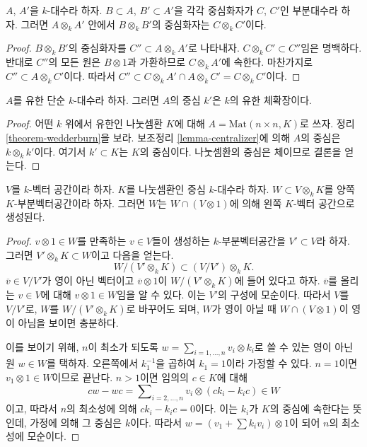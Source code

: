 \begin{lemma}
\label{lemma-centralizer}
$A$, $A'$을 $k$-대수라 하자. $B \subset A$, $B' \subset A'$을
각각 중심화자가 $C$, $C'$인 부분대수라 하자. 그러면
$A \otimes_k A'$ 안에서 $B \otimes_k B'$의 중심화자는
$C \otimes_k C'$이다.
\end{lemma}

\begin{proof}
$B \otimes_k B'$의 중심화자를 $C'' \subset A \otimes_k A'$로 나타내자.
$C \otimes_k C' \subset C''$임은 명백하다. 반대로 $C''$의 모든 원은
$B \otimes 1$과 가환하므로 $C \otimes_k A'$에 속한다.
마찬가지로 $C'' \subset A \otimes_k C'$이다. 따라서
$C'' \subset C \otimes_k A' \cap A \otimes_k C' = C \otimes_k C'$이다.
\end{proof}

\begin{lemma}
\label{lemma-center-csa}
$A$를 유한 단순 $k$-대수라 하자. 그러면 $A$의 중심 $k'$은
$k$의 유한 체확장이다.
\end{lemma}

\begin{proof}
어떤 $k$ 위에서 유한인 나눗셈환 $K$에 대해
$A = \text{Mat}(n \times n, K)$로 쓰자. 정리
\ref{theorem-wedderburn}을 보라.
보조정리 \ref{lemma-centralizer}에 의해 $A$의 중심은
$k \otimes_k k'$이다. 여기서 $k' \subset K$는 $K$의 중심이다.
나눗셈환의 중심은 체이므로 결론을 얻는다.
\end{proof}

\begin{lemma}
\label{lemma-generate-two-sided-sub}
$V$를 $k$-벡터 공간이라 하자. $K$를 나눗셈환인 중심 $k$-대수라 하자.
$W \subset V \otimes_k K$를 양쪽 $K$-부분벡터공간이라 하자. 그러면
$W$는 $W \cap (V \otimes 1)$에 의해 왼쪽 $K$-벡터 공간으로 생성된다.
\end{lemma}

\begin{proof}
$v \otimes 1 \in W$를 만족하는 $v \in V$들이 생성하는 $k$-부분벡터공간을
$V' \subset V$라 하자. 그러면 $V' \otimes_k K \subset W$이고 다음을 얻는다.
$$
W/(V' \otimes_k K)  \subset  (V/V') \otimes_k K.
$$
$\overline{v} \in V/V'$가 영이 아닌 벡터이고
$\overline{v} \otimes 1$이 $W/(V' \otimes_k K)$에 들어 있다고 하자.
$\overline{v}$를 올리는 $v \in V$에 대해 $v \otimes 1 \in W$임을 알 수 있다.
이는 $V'$의 구성에 모순이다. 따라서 $V$를 $V/V'$로, $W$를
$W/(V' \otimes_k K)$로 바꾸어도 되며, $W$가 영이 아닐 때
$W \cap (V \otimes 1)$이 영이 아님을 보이면 충분하다.

\medskip\noindent
이를 보이기 위해, $n$이 최소가 되도록
$w = \sum_{i = 1, \ldots, n} v_i \otimes k_i$로 쓸 수 있는 영이 아닌 원
$w \in W$를 택하자. 오른쪽에서 $k_1^{-1}$을 곱하여 $k_1 = 1$이라
가정할 수 있다. $n = 1$이면 $v_1 \otimes 1 \in W$이므로 끝난다.
$n > 1$이면 임의의 $c \in K$에 대해
$$
c w - w c = \sum\nolimits_{i = 2, \ldots, n} v_i \otimes (c k_i - k_i c) \in W
$$
이고, 따라서 $n$의 최소성에 의해 $c k_i - k_i c = 0$이다.
이는 $k_i$가 $K$의 중심에 속한다는 뜻인데, 가정에 의해 그 중심은
$k$이다. 따라서 $w = (v_1 + \sum k_i v_i) \otimes 1$이 되어
$n$의 최소성에 모순이다.
\end{proof}

